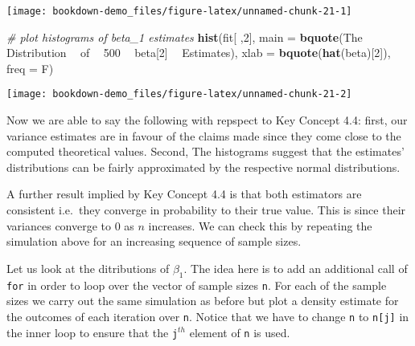 \documentclass[]{book}
\newenvironment{Shaded}{\begin{snugshade}}{\end{snugshade}}
\newcommand{\KeywordTok}[1]{\textcolor[rgb]{0.13,0.29,0.53}{\textbf{#1}}}
\newcommand{\DataTypeTok}[1]{\textcolor[rgb]{0.13,0.29,0.53}{#1}}
\newcommand{\DecValTok}[1]{\textcolor[rgb]{0.00,0.00,0.81}{#1}}
\newcommand{\StringTok}[1]{\textcolor[rgb]{0.31,0.60,0.02}{#1}}
\newcommand{\CommentTok}[1]{\textcolor[rgb]{0.56,0.35,0.01}{\textit{#1}}}
\newcommand{\OperatorTok}[1]{\textcolor[rgb]{0.81,0.36,0.00}{\textbf{#1}}}
\newcommand{\NormalTok}[1]{#1}
\theoremstyle{definition}
\theoremstyle{definition}
\theoremstyle{definition}
\theoremstyle{remark}
\begin{document}
\begin{center}\texttt{[image: bookdown-demo\_files/figure-latex/unnamed-chunk-21-1]} \end{center}

\begin{Shaded}
\begin{Highlighting}[]
\CommentTok{# plot histograms of beta_1 estimates}
\KeywordTok{hist}\NormalTok{(fit[ ,}\DecValTok{2}\NormalTok{], }\DataTypeTok{main =} \KeywordTok{bquote}\NormalTok{(The }\OperatorTok{~}\StringTok{ }\NormalTok{Distribution  }\OperatorTok{~}\StringTok{ }\NormalTok{of }\OperatorTok{~}\StringTok{ }\DecValTok{500} \OperatorTok{~}\StringTok{ }\NormalTok{beta[}\DecValTok{2}\NormalTok{] }\OperatorTok{~}\StringTok{ }\NormalTok{Estimates), }\DataTypeTok{xlab =} \KeywordTok{bquote}\NormalTok{(}\KeywordTok{hat}\NormalTok{(beta)[}\DecValTok{2}\NormalTok{]), }\DataTypeTok{freq =}\NormalTok{ F)}
\end{Highlighting}
\end{Shaded}

\begin{center}\texttt{[image: bookdown-demo\_files/figure-latex/unnamed-chunk-21-2]} \end{center}

Now we are able to say the following with repspect to Key Concept 4.4:
first, our variance estimates are in favour of the claims made since
they come close to the computed theoretical values. Second, The
histograms suggest that the estimates' distributions can be fairly
approximated by the respective normal distributions.

A further result implied by Key Concept 4.4 is that both estimators are
consistent i.e.~they converge in probability to their true value. This
is since their variances converge to \(0\) as \(n\) increases. We can
check this by repeating the simulation above for an increasing sequence
of sample sizes.

Let us look at the ditributions of \(\beta_1\). The idea here is to add
an additional call of \texttt{for} in order to loop over the vector of
sample sizes \texttt{n}. For each of the sample sizes we carry out the
same simulation as before but plot a density estimate for the outcomes
of each iteration over \texttt{n}. Notice that we have to change
\texttt{n} to \texttt{n{[}j{]}} in the inner loop to ensure that the
\texttt{j}\(^{th}\) element of \texttt{n} is used.
\end{document}
